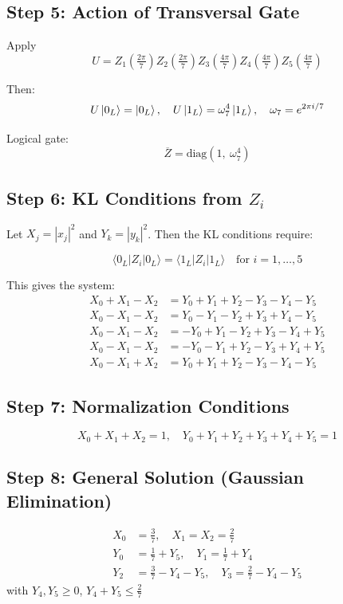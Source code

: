 \documentclass{article}
\begin{document}
\subsection*{Step 5: Action of Transversal Gate}

Apply
\[
U = Z_1\left(\tfrac{2\pi}{7}\right) Z_2\left(\tfrac{2\pi}{7}\right) Z_3\left(\tfrac{4\pi}{7}\right) Z_4\left(\tfrac{4\pi}{7}\right) Z_5\left(\tfrac{4\pi}{7}\right)
\]

Then:
\[
U \ket{0_L} = \ket{0_L}, \quad U \ket{1_L} = \omega_7^4 \ket{1_L}, \quad \omega_7 = e^{2\pi i/7}
\]

Logical gate:
\[
\overline{Z} = \text{diag}(1,\ \omega_7^4)
\]

\subsection*{Step 6: KL Conditions from \( Z_i \)}

Let \( X_j = |x_j|^2 \) and \( Y_k = |y_k|^2 \). Then the KL conditions require:

\[
\langle 0_L | Z_i | 0_L \rangle = \langle 1_L | Z_i | 1_L \rangle \quad \text{for } i = 1,\dots,5
\]

This gives the system:
\begin{align*}
X_0 + X_1 - X_2 &= Y_0 + Y_1 + Y_2 - Y_3 - Y_4 - Y_5 \\
X_0 - X_1 - X_2 &= Y_0 - Y_1 - Y_2 + Y_3 + Y_4 - Y_5 \\
X_0 - X_1 - X_2 &= -Y_0 + Y_1 - Y_2 + Y_3 - Y_4 + Y_5 \\
X_0 - X_1 - X_2 &= -Y_0 - Y_1 + Y_2 - Y_3 + Y_4 + Y_5 \\
X_0 - X_1 + X_2 &= Y_0 + Y_1 + Y_2 - Y_3 - Y_4 - Y_5
\end{align*}

\subsection*{Step 7: Normalization Conditions}

\[
X_0 + X_1 + X_2 = 1, \quad Y_0 + Y_1 + Y_2 + Y_3 + Y_4 + Y_5 = 1
\]

\subsection*{Step 8: General Solution (Gaussian Elimination)}

\[
\begin{aligned}
X_0 &= \frac{3}{7},\quad X_1 = X_2 = \frac{2}{7} \\
Y_0 &= \frac{1}{7} + Y_5,\quad Y_1 = \frac{1}{7} + Y_4 \\
Y_2 &= \frac{3}{7} - Y_4 - Y_5,\quad Y_3 = \frac{2}{7} - Y_4 - Y_5
\end{aligned}
\]
with \( Y_4, Y_5 \geq 0 \), \( Y_4 + Y_5 \leq \frac{2}{7} \)
\end{document}
